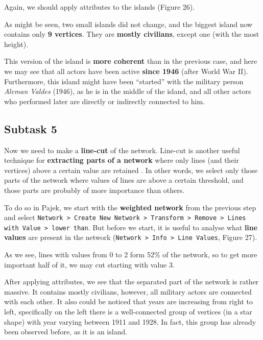 \FloatBarrier

Again, we should apply attributes to the islands (Figure 26).

\FloatBarrier

As might be seen, two small islands did not change, and the biggest island now contains only \textbf{9 vertices}. They are \textbf{mostly civilians}, except one (with the most height).

This version of the island is \textbf{more coherent} than in the previous case, and here we may see that all actors have been active \textbf{since 1946} (after World War II). Furthermore, this island might have been “started” with the military person \textit{Aleman Valdes} (1946), as he is in the middle of the island, and all other actors who performed later are directly or indirectly connected to him.
\clearpage


\subsection{Subtask 5}

Now we need to make a \textbf{line-cut} of the network. Line-cut is another useful technique for \textbf{extracting parts of a network} where only lines (and their vertices) above a certain value are retained \cite{batagelj_doreian_ferligoj_kejzar_2014}. In other words, we select only those parts of the network where values of lines are above a certain threshold, and those parts are probably of more importance than others.

To do so in Pajek, we start with the \textbf{weighted network} from the previous step and select \texttt{Network > Create New Network > Transform > Remove > Lines with Value > lower than}. But before we start, it is useful to analyse what \textbf{line values} are present in the network (\texttt{Network > Info > Line Values}, Figure 27).

\FloatBarrier

As we see, lines with values from 0 to 2 form 52\% of the network, so to get more important half of it, we may cut starting with value 3.

\FloatBarrier

After applying attributes, we see that the separated part of the network is rather massive. It contains mostly civilians, however, all military actors are connected with each other. It also could be noticed that years are increasing from right to left, specifically on the left there is a well-connected group of vertices (in a star shape) with year varying between 1911 and 1928. In fact, this group has already been observed before, as it is an island.


